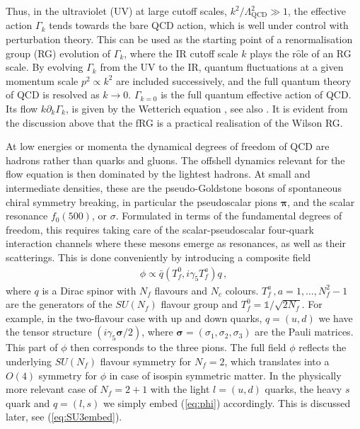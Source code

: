 \documentclass[%
reprint,
superscriptaddress,
showpacs,preprintnumbers,
 amsmath,amssymb,
 aps,
prd,
]{revtex4-1}
\def\eq#1{(\ref{#1})}
\begin{document}
Thus, in the ultraviolet (UV) at large cutoff scales,
$k^2/\Lambda_\textrm{QCD}^2\gg 1$, the effective action $\Gamma_k$
tends towards the bare QCD action, which is well under control with
perturbation theory.  This can be used as the starting point of a
renormalisation group (RG) evolution of $\Gamma_k$, where the IR
cutoff scale $k$ plays the r$\hat{\textrm{o}}$le of an RG scale. By
evolving $\Gamma_k$ from the UV to the IR, quantum fluctuations at a
given momentum scale $p^2 \propto k^2$ are included successively, and
the full quantum theory of QCD is resolved as $k \rightarrow
0$. $\Gamma_{k=0}$ is the full quantum effective action of QCD. Its
flow $k \partial_k\Gamma_k$, is given by the Wetterich equation
\cite{Wetterich:1992yh}, see also \cite{Ellwanger:1993mw,
  Morris:1993qb}. It is evident from the discussion above that the fRG
is a practical realisation of the Wilson RG.

At low energies or momenta the dynamical degrees of freedom of QCD are
hadrons rather than quarks and gluons. The offshell dynamics relevant
for the flow equation is then dominated by the lightest hadrons. At
small and intermediate densities, these are the pseudo-Goldstone
bosons of spontaneous chiral symmetry breaking, in particular the
pseudoscalar pions $\bm\pi$, and the scalar resonance $f_0(500)$, or
$\sigma$. Formulated in terms of the fundamental degrees of freedom,
this requires taking care of the scalar-pseudoscalar four-quark
  interaction channels where these mesons emerge as resonances, as
well as their scatterings. This is done conveniently by introducing a
composite field
%
\begin{align}\label{eq:phi}
  \phi\propto \bar q (T_f^0 ,
  i \gamma_5 T_f^a) q\,, 
\end{align}
%
where $q$ is a Dirac spinor with $N_f$ flavours and $N_c$ colours.
$T_f^a\,, a \!=\! 1,\dots , N_f^2 -1 $ are the generators of the
$SU(N_f)$ flavour group and $T^0_f = \mathbb{1}/\sqrt{2 N_f}$. For
example, in the two-flavour case with up and down quarks, $q=(u,d)$ we
have the tensor structure $( i \gamma_5 \bm{\sigma}/2)$, where
$\bm\sigma =(\sigma_1,\sigma_2,\sigma_3)$ are the Pauli matrices. This
part of $\phi$ then corresponds to the three pions. The full field
$\phi$ reflects the underlying $SU(N_f)$ flavour symmetry for $N_f=2$,
which translates into a $O(4)$ symmetry for $\phi$ in case of isospin
symmetric matter. In the physically more relevant case of $N_f=2+1$
with the light $l=(u,d)$ quarks, the heavy $s$ quark and $q=(l,s)$ we
simply embed \eq{eq:phi} accordingly. This is discussed later, see
\eq{eq:SU3embed}.
\end{document}
